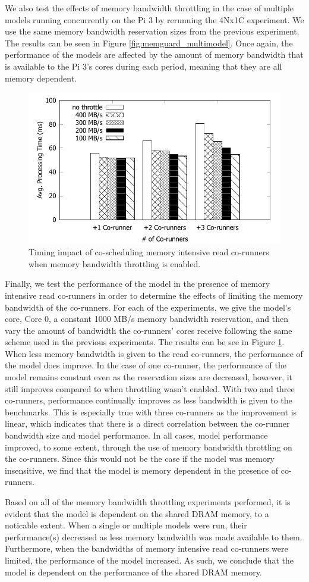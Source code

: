 We also test the effects of memory bandwidth throttling in the case 
of multiple models running concurrently on the Pi 3 by rerunning the 
4Nx1C experiment. We use the same memory bandwidth reservation sizes 
from the previous experiment. The results can be seen in Figure
\ref{fig:memguard_multimodel}. Once again, the performance of the 
models are affected by the amount of memory bandwidth that is 
available to the Pi 3's cores during each period, meaning that they 
are all memory dependent.

\begin{figure}[h]
  \centering
  \includegraphics[width=.45\textwidth]{figs/memguard_bandwidth}
  \caption{Timing impact of co-scheduling memory intensive read
co-runners when memory bandwidth throttling is enabled. }
  \label{fig:memguard_bandwidth}
\end{figure}

Finally, we test the performance of the model in the presence of 
memory intensive read co-runners in order to determine the effects of 
limiting the memory bandwidth of the co-runners. For each of the 
experiments, we give the model's core, Core 0, a constant 1000 MB/s 
memory bandwidth reservation, and then vary the amount of bandwidth 
the co-runners' cores receive following the same scheme used in the 
previous experiments. The results can be see in Figure
\ref{fig:memguard_bandwidth}. When less memory bandwidth is given to 
the read co-runners, the performance of the model does improve. In 
the case of one co-runner, the performance of the model remains 
constant even as the reservation sizes are decreased, however, it 
still improves compared to when throttling wasn't enabled. With two 
and three co-runners, performance continually improves as less 
bandwidth is given to the benchmarks. This is especially true with 
three co-runners as the improvement is linear, which indicates that 
there is a direct correlation between the co-runner bandwidth size 
and model performance. In all cases, model performance improved, to 
some extent, through the use of memory bandwidth throttling on the 
co-runners. Since this would not be the case if the model was memory 
insensitive, we find that the model is memory dependent in the 
presence of co-runners.

Based on all of the memory bandwidth throttling experiments 
performed, it is evident that the model is dependent on the shared 
DRAM memory, to a noticable extent. When a single or multiple models 
were run, their performance(s) decreased as less memory bandwidth was 
made available to them. Furthermore, when the bandwidths of memory 
intensive read co-runners were limited, the performance of the model 
increased. As such, we conclude that the model is dependent on the 
performance of the shared DRAM memory.